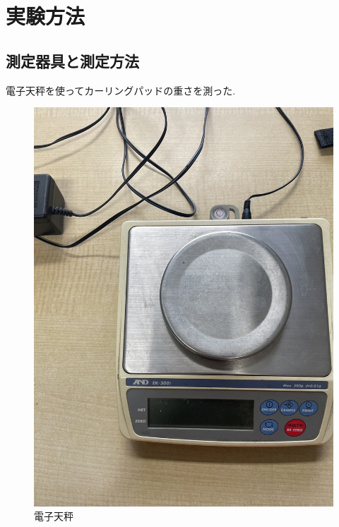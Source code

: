 \documentclass[main]{subfiles}
\begin{document}
\chapter{実験方法}
\section{測定器具と測定方法}
電子天秤を使ってカーリングパッドの重さを測った.
\begin{figure}[htbp]
    \centering
    \includegraphics[scale=0.2]{figures/denshitenbinn.jpg}
    \caption{電子天秤}
    \label{fig:label}
\end{figure}
\end{document}
